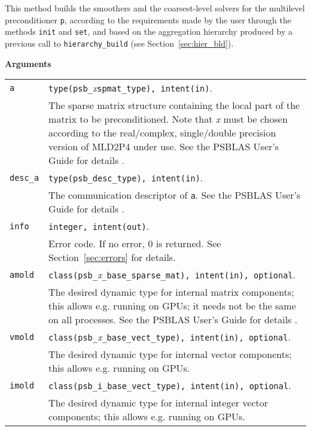 \noindent
This method builds the smoothers and the coarsest-level solvers for the
multilevel preconditioner \verb|p|, according to the requirements made by
the user through the methods \verb|init| and \verb|set|, and based on the aggregation
hierarchy produced by a previous call to \verb|hierarchy_build|
(see Section~\ref{sec:hier_bld}). 

{\baselineskip\noindent\large\bfseries Arguments} \smallskip

\begin{tabular}{p{1.2cm}p{12cm}}
\verb|a|      & \verb|type(psb_|\emph{x}\verb|spmat_type), intent(in)|. \\
              & The sparse matrix structure containing the local part of the
                matrix to be preconditioned. Note that \emph{x} must be chosen according
                to the real/complex, single/double precision version of MLD2P4 under use.
                See the PSBLAS User's Guide for details \cite{PSBLASGUIDE}.\\
\verb|desc_a| & \verb|type(psb_desc_type), intent(in)|. \\
              & The communication descriptor of \verb|a|. See the PSBLAS User's Guide for
                details \cite{PSBLASGUIDE}.\\
\verb|info|   & \verb|integer, intent(out)|.\\
              & Error code. If no error, 0 is returned. See Section~\ref{sec:errors} for details.\\
\verb|amold| & \verb|class(psb_|\emph{x}\verb|_base_sparse_mat), intent(in), optional|. \\
 & The desired dynamic type for internal matrix
  components; this allows e.g. running on GPUs; it needs not be the
  same on all processes. See the PSBLAS User's Guide for
  details \cite{PSBLASGUIDE}. \\
  \verb|vmold| & \verb|class(psb_|\emph{x}\verb|_base_vect_type), intent(in), optional|. \\
  & The desired dynamic type for internal vector
  components; this allows e.g. running on GPUs. \\
  \verb|imold| & \verb|class(psb_i_base_vect_type), intent(in), optional|. \\
  & The desired dynamic type for internal integer vector
  components; this allows e.g. running on GPUs. \\
\end{tabular}


